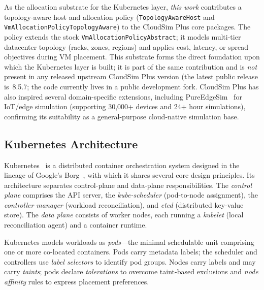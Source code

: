\documentclass[ASNA,twocolumn]{USG}
\begin{document}
    As the allocation substrate for the Kubernetes layer, \emph{this
    work} contributes a topology-aware host and allocation policy
    (\texttt{TopologyAwareHost} and
    \texttt{VmAllocationPolicyTopologyAware}) to the CloudSim Plus core
    packages. The policy extends the stock
    \texttt{VmAllocationPolicyAbstract}; it models multi-tier datacenter
    topology (racks, zones, regions) and applies cost, latency, or spread
    objectives during VM placement. This substrate forms the direct
    foundation upon which the Kubernetes layer is built; it is part of the
    same contribution and is \emph{not} present in any released upstream
    CloudSim Plus version (the latest public release is~8.5.7; the code
    currently lives in a public development fork. 
    CloudSim Plus has also inspired several domain-specific extensions,
    including PureEdgeSim~\cite{PureEdgeSim} for IoT/edge simulation
    (supporting 30{,}000+ devices and 24+ hour simulations), confirming
    its suitability as a general-purpose cloud-native simulation base.

    \subsection{Kubernetes Architecture}

    Kubernetes~\cite{Verma2015,Burns2016} is a distributed container
    orchestration system designed in the lineage of Google's
    Borg~\cite{Verma2015}, with which it shares several core design
    principles. Its architecture separates control-plane and
    data-plane responsibilities. The \emph{control plane} comprises the
    API server, the \emph{kube-scheduler} (pod-to-node assignment), the
    \emph{controller manager} (workload reconciliation), and \emph{etcd}
    (distributed key-value store). The \emph{data plane} consists of
    worker nodes, each running a \emph{kubelet} (local reconciliation
    agent) and a container runtime.

    Kubernetes models workloads as \emph{pods}---the minimal schedulable
    unit comprising one or more co-located containers. Pods carry metadata
    labels; the scheduler and controllers use \emph{label selectors} to
    identify pod groups. Nodes carry labels and may carry \emph{taints};
    pods declare \emph{tolerations} to overcome taint-based exclusions and
    \emph{node affinity} rules to express placement preferences.
\end{document}
